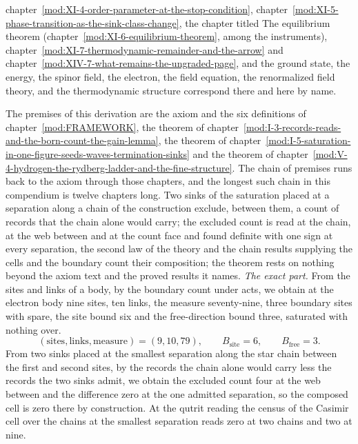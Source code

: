 \begin{chbridge}
chapter~\ref{mod:XI-4-order-parameter-at-the-stop-condition}, chapter~\ref{mod:XI-5-phase-transition-as-the-sink-class-change}, the chapter titled The equilibrium theorem (chapter~\ref{mod:XI-6-equilibrium-theorem}, among the instruments), chapter~\ref{mod:XI-7-thermodynamic-remainder-and-the-arrow} and chapter~\ref{mod:XIV-7-what-remains-the-ungraded-page}, and the ground state, the energy, the spinor field, the electron, the field equation, the renormalized field theory, and the thermodynamic structure correspond there and here by name.
\end{chbridge}
\begin{chproof}
The premises of this derivation are the axiom and the six definitions of chapter~\ref{mod:FRAMEWORK}, the theorem of chapter~\ref{mod:I-3-records-reads-and-the-born-count-the-gain-lemma}, the theorem of chapter~\ref{mod:I-5-saturation-in-one-figure-seeds-waves-termination-sinks} and the theorem of chapter~\ref{mod:V-4-hydrogen-the-rydberg-ladder-and-the-fine-structure}. The chain of premises runs back to the axiom through those chapters, and the longest such chain in this compendium is twelve chapters long.
Two sinks of the saturation placed at a separation along a chain of the construction exclude, between them, a count of records that the chain alone would carry; the excluded count is read at the chain, at the web between and at the count face and found definite with one sign at every separation, the second law of the theory and the chain results supplying the cells and the boundary count their composition; the theorem rests on nothing beyond the axiom text and the proved results it names.
\textit{The exact part.}
From the sites and links of a body, by the boundary count under acts, we obtain at the electron body nine sites, ten links, the measure seventy-nine, three boundary sites with spare, the site bound six and the free-direction bound three, saturated with nothing over.
\begin{equation}
(\text{sites}, \text{links}, \text{measure}) = (9, 10, 79), \qquad B_{\mathrm{site}} = 6, \qquad B_{\mathrm{free}} = 3 .
\end{equation}
From two sinks placed at the smallest separation along the star chain between the first and second sites, by the records the chain alone would carry less the records the two sinks admit, we obtain the excluded count four at the web between and the difference zero at the one admitted separation, so the composed cell is zero there by construction. At the qutrit reading the census of the Casimir cell over the chains at the smallest separation reads zero at two chains and two at nine.

\end{chproof}
